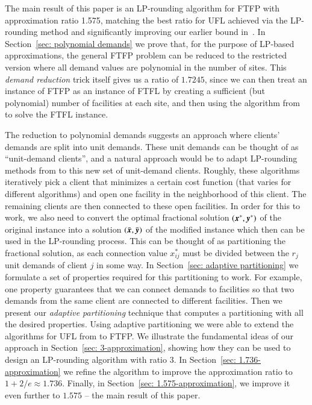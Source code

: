 \smallskip

The main result of this paper is an LP-rounding algorithm
for FTFP with approximation ratio 1.575, matching the best
ratio for UFL achieved via the LP-rounding method
\cite{ByrkaGS10} and significantly improving our earlier
bound in~\cite{YanC11}. In Section~\ref{sec: polynomial
  demands} we prove that, for the purpose of LP-based
approximations, the general FTFP problem can be reduced to
the restricted version where all demand values are
polynomial in the number of sites.  This \emph{demand
  reduction} trick itself gives us a ratio of $1.7245$,
since we can then treat an instance of FTFP as an instance
of FTFL by creating a sufficient (but polynomial) number of
facilities at each site, and then using the algorithm
from~\cite{ByrkaSS10} to solve the FTFL instance.

The reduction to polynomial demands suggests an approach where
clients' demands are split into unit demands. These unit demands can
be thought of as ``unit-demand clients'', and a natural approach would
be to adapt LP-rounding methods from
\cite{gupta08,ChudakS04,ByrkaGS10} to this new set of unit-demand
clients.  Roughly, these algorithms iteratively pick a client that
minimizes a certain cost function (that varies for different
algorithms) and open one facility in the neighborhood of this
client. The remaining clients are then connected to these open
facilities.  In order for this to work, we also need to convert the
optimal fractional solution $(\boldsymbol{x}^\ast,\boldsymbol{y}^\ast)$ of the original
instance into a solution $(\bar{\boldsymbol{x}},\bar{\boldsymbol{y}})$ of the modified instance
which then can be used in the LP-rounding process. This can be thought
of as partitioning the fractional solution, as each connection value
$x^\ast_{ij}$ must be divided between the $r_j$ unit demands
of client $j$ in some way. In Section~\ref{sec: adaptive partitioning} we
formulate a set of properties required for this partitioning to
work. For example, one property guarantees that we can connect demands
to facilities so that two demands from the same client are connected
to different facilities. Then we present our \emph{adaptive
  partitioning} technique that computes a partitioning with all the
desired properties. Using adaptive partitioning we were able to extend
the algorithms for UFL from \cite{gupta08,ChudakS04,ByrkaGS10} to
FTFP. We illustrate the fundamental ideas of our approach in
Section~\ref{sec: 3-approximation}, showing how they can be used to
design an LP-rounding algorithm with ratio $3$.  In Section~\ref{sec:
  1.736-approximation} we refine the algorithm to improve the
approximation ratio to $1+2/e\approx 1.736$.  Finally, in
Section~\ref{sec: 1.575-approximation}, we improve it even further to
$1.575$ -- the main result of this paper.

